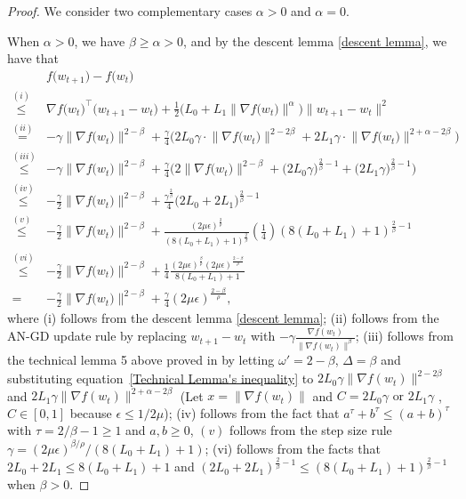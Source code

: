 \documentclass[10pt]{article} %
\def\eqref#1{equation~\ref{#1}}
\newtheorem{proof}{Proof}
\begin{document}
\begin{proof}
We consider two complementary cases $\alpha>0$ and $\alpha=0$.

When $\alpha>0$, we have $\beta\ge\alpha>0$, and by the descent lemma \ref{descent lemma}, we have that
\begin{align}
& f\big(w_{t+1}\big)-f\big(w_t\big) \nonumber\\
\overset{(i)}{\leq}& \nabla f\big(w_t\big)^{\top}\big(w_{t+1}-w_t\big)+\frac{1}{2}\big(L_0+L_1\big\|\nabla f\big(w_t\big)\big\|^\alpha\big)\big\|w_{t+1}-w_t\big\|^2 \nonumber\\
\overset{(ii)}{=}&-\gamma\big\|\nabla f\big(w_t\big)\big\|^{2-\beta}+\frac{\gamma}{4}\big(2 L_0 \gamma \cdot\big\|\nabla f\big(w_t\big)\big\|^{2-2 \beta}+2 L_1 \gamma \cdot\big\|\nabla f\big(w_t\big)\big\|^{2+\alpha-2 \beta}\big) \nonumber\\
\overset{(iii)}{\leq}&-\gamma\big\|\nabla f\big(w_t\big)\big\|^{2-\beta} +\frac{\gamma}{4}\big(2\big\|\nabla f\big(w_t\big)\big\|^{2-\beta}+\big(2 L_0 \gamma\big)^{\frac{2}{\beta}-1}+\big(2 L_1 \gamma\big)^{\frac{2}{\beta}-1}\big) \nonumber\\
\overset{(iv)}{\leq}&-\frac{\gamma}{2}\big\|\nabla f\big(w_t\big)\big\|^{2-\beta}+\frac{\gamma^{\frac{2}{\beta}}}{4}\big(2 L_0+2 L_1\big)^{\frac{2}{\beta}-1} \nonumber\\
\overset{(v)}{\leq}&-\frac{\gamma}{2}\big\|\nabla f\big(w_t\big)\big\|^{2-\beta}+\frac{(2\mu\epsilon)^{\frac{2}{\rho}}}{(8(L_0+L_1)+1)^{\frac{2}{\beta}}}(\frac{1}{4})(8(L_0+L_1)+1)^{\frac{2}{\beta}-1} \nonumber\\
\overset{(vi)}{\leq}& -\frac{\gamma}{2}\big\|\nabla f\big(w_t\big)\big\|^{2-\beta} +\frac{1}{4}\frac{(2\mu\epsilon)^{\frac{\beta}{\rho}}(2\mu\epsilon)^{\frac{2-\beta}{\rho}}}{8(L_0+L_1)+1}\nonumber\\
=& -\frac{\gamma}{2}\big\|\nabla f\big(w_t\big)\big\|^{2-\beta}+\frac{\gamma}{4} (2\mu\epsilon)^{\frac{2-\beta}{\rho}},
\end{align}
where (i) follows from the descent lemma \ref{descent lemma}; (ii) follows from the AN-GD update rule by replacing $w_{t+1}-w_t$ with $-\gamma\frac{\nabla f(w_t)}{\|\nabla f(w_t) \|^{\beta}}$; (iii) follows from the technical lemma 5 above proved in \citet{pmlr-v202-chen23ar} by letting $\omega' = 2-\beta$, $\Delta = \beta$ and substituting \eqref{Technical Lemma's inequality} to $2L_0 \gamma \|\nabla f(w_t) \|^{2-2\beta}$ and $2L_1 \gamma \|\nabla f(w_t) \|^{2+\alpha-2\beta}$ (Let $x=\|\nabla f(w_t) \|$ and $C=2L_0\gamma \text{ or }2L_1\gamma$ , $C\in[0,1]$ because $\epsilon \leq 1/2\mu$);
(iv) follows from the fact that $a^{\tau}+b^{\tau}\leq(a+b)^{\tau}$ with $\tau = {2}/{\beta}-1\geq1$ and $a,b\geq 0$, $(v)$ follows from the step size rule $\gamma = {(2\mu\epsilon)^{\beta/\rho}}/{(8(L_0+L_1)+1)}$; (vi) follows from the facts that $2L_0+2L_1 \leq 8(L_0+L_1)+1$ and $(2L_0+2L_1)^{\frac{2}{\beta}-1} \leq (8(L_0+L_1)+1)^{\frac{2}{\beta}-1}$ when $\beta>0$.


\end{proof}
\end{document}
